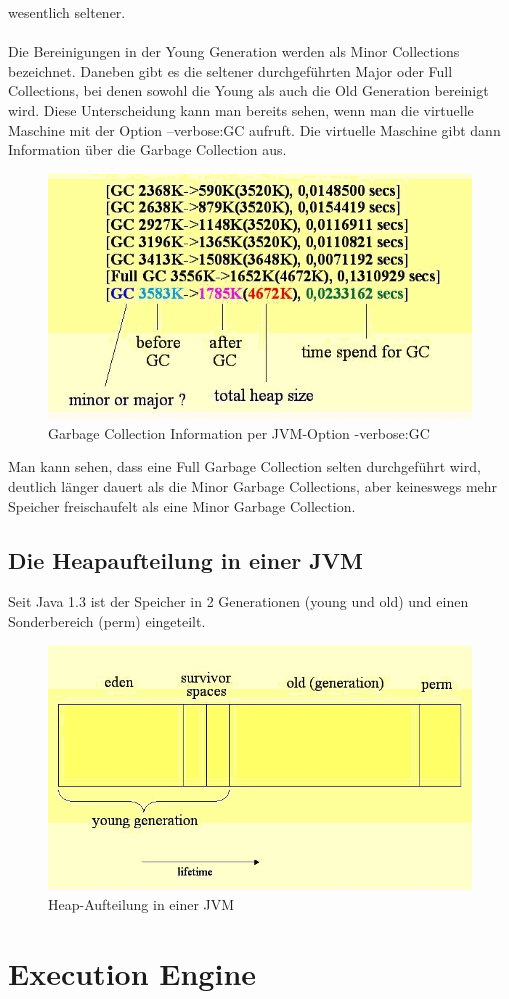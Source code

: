 \documentclass[a4paper,14pt]{scrreprt}
\begin{document}
wesentlich seltener.\\\\Die Bereinigungen in der Young Generation werden als Minor Collections bezeichnet.  Daneben gibt es die seltener durchgeführten Major oder Full Collections, bei denen sowohl die Young als auch die Old Generation bereinigt wird. Diese Unterscheidung kann man bereits sehen, wenn man die virtuelle Maschine mit der Option –verbose:GC aufruft.  Die virtuelle Maschine gibt dann Information über die Garbage Collection aus.
\begin{figure}[h!]
\centering
\includegraphics[width=0.8\linewidth]{./imageGQ3}
\caption[Garbage Collection Information per JVM-Option -verbose:GC]{Garbage Collection Information per JVM-Option -verbose:GC}
\label{fig:imageGQ3}
\end{figure}
Man kann sehen, dass eine Full Garbage Collection selten durchgeführt wird, deutlich länger dauert als die Minor Garbage Collections, aber keineswegs mehr Speicher freischaufelt als eine Minor Garbage Collection.
\subsection{Die Heapaufteilung in einer JVM}
Seit Java 1.3 ist der Speicher in 2 Generationen (young und old) und einen Sonderbereich (perm) eingeteilt.
\begin{figure}[h!]
\centering
\includegraphics[width=0.8\linewidth]{./imageDD1}
\caption[Heap-Aufteilung in einer JVM]{Heap-Aufteilung in einer JVM}
\label{fig:imageDD1}
\end{figure}
\cite{jvmGarb}
\section{Execution Engine}

\cite{jvmEin1}

\end{document}
